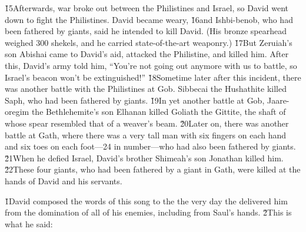 \v{15}Afterwards, war broke out between the Philistines and Israel, so David went down to fight the Philistines. David became weary, \v{16}and Ishbi-benob, who had been fathered by giants, said he intended to kill David. (His bronze spearhead weighed 300 shekels, and he carried state-of-the-art weaponry.) \v{17}But Zeruiah's son Abishai came to David's aid, attacked the Philistine, and killed him. After this, David's army told him, ``You're not going out anymore with us to battle, so Israel's beacon won't be extinguished!'' \v{18}Sometime later after this incident, there was another battle with the Philistines at Gob. Sibbecai the Hushathite killed Saph, who had been fathered by giants. \v{19}In yet another battle at Gob, Jaare-oregim the Bethlehemite's son Elhanan killed Goliath the Gittite, the shaft of whose spear resembled that of a weaver's beam. \v{20}Later on, there was another battle at Gath, where there was a very tall man with six fingers on each hand and six toes on each foot---24 in number---who had also been fathered by giants. \v{21}When he defied Israel, David's brother Shimeah's son Jonathan killed him. \v{22}These four giants, who had been fathered by a giant in Gath, were killed at the hands of David and his servants.

\v{1}David composed the words of this song to the  the very day the  delivered him from the domination of all of his enemies, including from Saul's hands. \v{2}This is what he said:

